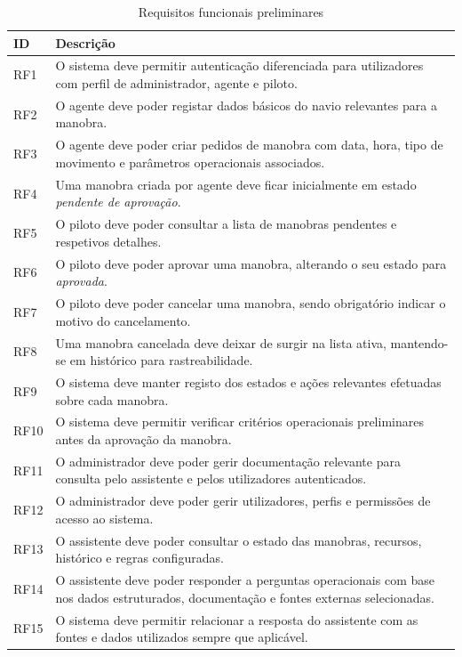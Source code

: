 \documentclass[a4paper,12pt]{report}
\begin{document}
\begin{table}[H]
\centering
\caption{Requisitos funcionais preliminares}
\label{tab:reqfunc}
\begin{tabular}{>{\raggedright\arraybackslash}p{2cm} >{\raggedright\arraybackslash}p{12cm}}
\toprule
\textbf{ID} & \textbf{Descrição} \\
\midrule
RF1 & O sistema deve permitir autenticação diferenciada para utilizadores com perfil de administrador, agente e piloto. \\
RF2 & O agente deve poder registar dados básicos do navio relevantes para a manobra. \\
RF3 & O agente deve poder criar pedidos de manobra com data, hora, tipo de movimento e parâmetros operacionais associados. \\
RF4 & Uma manobra criada por agente deve ficar inicialmente em estado \textit{pendente de aprovação}. \\
RF5 & O piloto deve poder consultar a lista de manobras pendentes e respetivos detalhes. \\
RF6 & O piloto deve poder aprovar uma manobra, alterando o seu estado para \textit{aprovada}. \\
RF7 & O piloto deve poder cancelar uma manobra, sendo obrigatório indicar o motivo do cancelamento. \\
RF8 & Uma manobra cancelada deve deixar de surgir na lista ativa, mantendo-se em histórico para rastreabilidade. \\
RF9 & O sistema deve manter registo dos estados e ações relevantes efetuadas sobre cada manobra. \\
RF10 & O sistema deve permitir verificar critérios operacionais preliminares antes da aprovação da manobra. \\
RF11 & O administrador deve poder gerir documentação relevante para consulta pelo assistente e pelos utilizadores autenticados. \\
RF12 & O administrador deve poder gerir utilizadores, perfis e permissões de acesso ao sistema. \\
RF13 & O assistente deve poder consultar o estado das manobras, recursos, histórico e regras configuradas. \\
RF14 & O assistente deve poder responder a perguntas operacionais com base nos dados estruturados, documentação e fontes externas selecionadas. \\
RF15 & O sistema deve permitir relacionar a resposta do assistente com as fontes e dados utilizados sempre que aplicável. \\
\bottomrule
\end{tabular}
\end{table}
\end{document}
